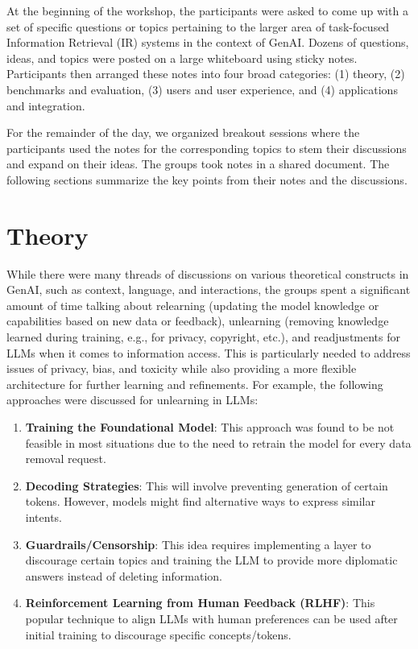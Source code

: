 \documentclass[11pt,dvipdfm]{article}
\begin{document}
At the beginning of the workshop, the participants were asked to come up with a set of specific questions or topics pertaining to the larger area of task-focused Information Retrieval (IR) systems in the context of GenAI. Dozens of questions, ideas, and topics were posted on a large whiteboard using sticky notes. Participants then arranged these notes into four broad categories: (1) theory, (2) benchmarks and evaluation, (3) users and user experience, and (4) applications and integration.

For the remainder of the day, we organized breakout sessions where the participants used the notes for the corresponding topics to stem their discussions and expand on their ideas. The groups took notes in a shared document. The following sections summarize the key points from their notes and the discussions.

\section{Theory}
While there were many threads of discussions on various theoretical constructs in GenAI, such as context, language, and interactions, the groups spent a significant amount of time talking about relearning (updating the model knowledge or capabilities based on new data or feedback), unlearning (removing knowledge learned during training, e.g., for privacy, copyright, etc.), and readjustments for LLMs when it comes to information access. This is particularly needed to address issues of privacy, bias, and toxicity while also providing a more flexible architecture for further learning and refinements. For example, the following approaches were discussed for unlearning in LLMs:

\begin{enumerate}
    \item {\bf Training the Foundational Model}: This approach was found to be not feasible in most situations due to the need to retrain the model for every data removal request.
    \item {\bf Decoding Strategies}: This will involve preventing generation of certain tokens. However, models might find alternative ways to express similar intents.
    \item {\bf Guardrails/Censorship}: This idea requires implementing a layer to discourage certain topics and training the LLM to provide more diplomatic answers instead of deleting information.
    \item {\bf Reinforcement Learning from Human Feedback (RLHF)}: This popular technique to align LLMs with human preferences \cite{ziegler2019fine} can be used after initial training to discourage specific concepts/tokens.
\end{enumerate}
\end{document}

